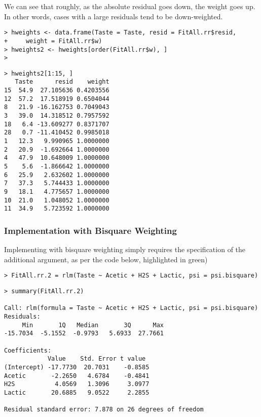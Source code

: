 \documentclass[main.tex]{subfiles}
\begin{document}
We can see that roughly, as the absolute residual goes down, the weight goes up. In other words, cases with a large residuals tend to be down-weighted.


\begin{framed}
\begin{verbatim}
> hweights <- data.frame(Taste = Taste, resid = FitAll.rr$resid,
+     weight = FitAll.rr$w)
> hweights2 <- hweights[order(FitAll.rr$w), ]
>
\end{verbatim}
\end{framed}

\begin{verbatim}
> hweights2[1:15, ]
   Taste      resid    weight
15  54.9  27.105636 0.4203556
12  57.2  17.518919 0.6504044
8   21.9 -16.162753 0.7049043
3   39.0  14.318512 0.7957592
18   6.4 -13.609277 0.8371707
28   0.7 -11.410452 0.9985018
1   12.3   9.990965 1.0000000
2   20.9  -1.692664 1.0000000
4   47.9  10.648009 1.0000000
5    5.6  -1.866642 1.0000000
6   25.9   2.632602 1.0000000
7   37.3   5.744433 1.0000000
9   18.1   4.775657 1.0000000
10  21.0   1.048052 1.0000000
11  34.9   5.723592 1.0000000
\end{verbatim}
\subsubsection{Implementation with Bisquare Weighting}
Implementing with bisquare weighting simply requires the specification of the additional argument, as per the code below, highlighted in green)
\begin{framed}
\begin{verbatim}
> FitAll.rr.2 = rlm(Taste ~ Acetic + H2S + Lactic, psi = psi.bisquare)
\end{verbatim}
\end{framed}
\begin{verbatim}
> summary(FitAll.rr.2)

Call: rlm(formula = Taste ~ Acetic + H2S + Lactic, psi = psi.bisquare)
Residuals:
     Min       1Q   Median       3Q      Max 
-15.7034  -5.1552  -0.9793   5.6933  27.7661 

Coefficients:
            Value    Std. Error t value 
(Intercept) -17.7730  20.7031    -0.8585
Acetic       -2.2650   4.6784    -0.4841
H2S           4.0569   1.3096     3.0977
Lactic       20.6885   9.0522     2.2855

Residual standard error: 7.878 on 26 degrees of freedom
\end{verbatim}
\end{document}
